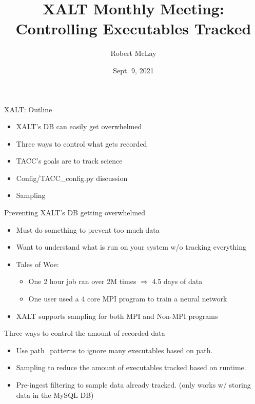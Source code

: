\documentclass{beamer}
\begin{document}
\title[XALT]{XALT Monthly Meeting: Controlling Executables Tracked}
\author{Robert McLay} 
\date{Sept.  9, 2021} 

\frame{\titlepage} 

\begin{frame}{XALT: Outline}
  \begin{itemize}
    \item XALT's DB can easily get overwhelmed
    \item Three ways to control what gets recorded
    \item TACC's goals are to track science
    \item Config/TACC\_config.py discussion
    \item Sampling
  \end{itemize}
\end{frame}

\begin{frame}{Preventing XALT's DB getting overwhelmed}
  \begin{itemize}
    \item Must do something to prevent too much data
    \item Want to understand what is run on your system w/o tracking everything
    \item Tales of Woe:
      \begin{itemize}
        \item One 2 hour job ran over 2M times $\Rightarrow$ 4.5 days
          of data
        \item One user used a 4 core MPI program to train a neural network
      \end{itemize}
    \item XALT supports sampling for both MPI and Non-MPI programs 
  \end{itemize}
\end{frame}

\begin{frame}{Three ways to control the amount of recorded data}
  \begin{itemize}
    \item Use path\_patterns to ignore many executables based on path.
    \item Sampling to reduce the amount of executables tracked based
      on runtime.
    \item Pre-ingest filtering to sample data already tracked.
      (only works w/ storing data in the MySQL DB)
  \end{itemize}
\end{frame}
\end{document}

